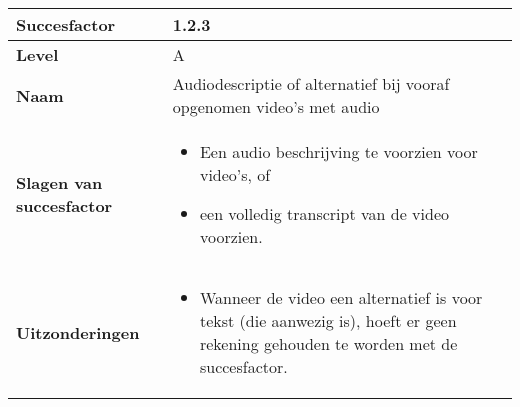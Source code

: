 \begin{table}[H]
    \centering
    \hspace*{-1cm}\begin{tabular}{|l|p{12cm}|} 
        \hline
        \textbf{Succesfactor}                & 1.2.3                                                                                                                                                                                                                                                                                                             \\ 
        \hline
        \textbf{Level}                       & A                                                                                                                                                                                                                                                                                                                                                                             \\ 
        \hline
        \textbf{Naam}                        & Audiodescriptie of alternatief bij vooraf opgenomen video’s met audio~                                                                                                                                                                                                                                                                                                                                                            \\ 
        \hline
        \textbf{Slagen van succesfactor}     & \begin{itemize}
            \item Een audio beschrijving te voorzien voor video’s, of
            \item een volledig transcript van de video voorzien.
        \end{itemize}                                                                                                                                                                                                      \\ 
        \hline
        \textbf{Uitzonderingen}     & \begin{itemize}
            \item Wanneer de video een alternatief is voor tekst (die aanwezig is), hoeft er geen rekening gehouden te worden met de succesfactor.
        \end{itemize}                                                                                                                                                                                                      \\ 

\end{tabular}
\end{table}
